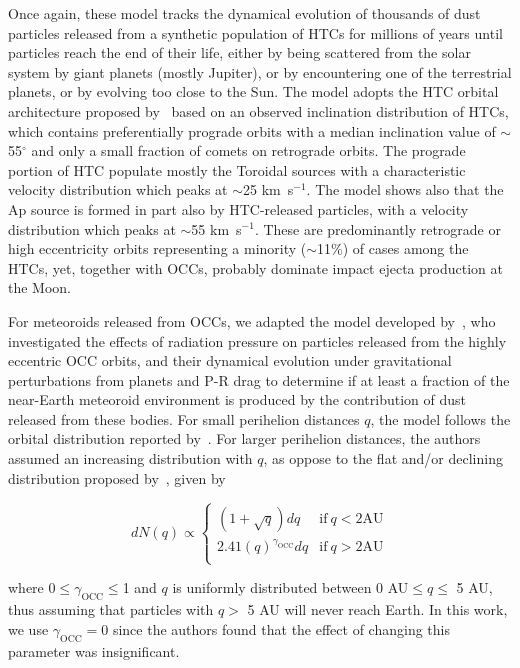\documentclass[twocolumn, trackchanges]{aastex62}
\begin{document}
Once again, these model tracks the dynamical evolution of thousands of dust particles released from a synthetic population of HTCs for millions of years until particles reach the end of their life, either by being scattered from the solar system by giant planets (mostly Jupiter), or by encountering one of the terrestrial planets, or by evolving too close to the Sun. The model adopts the HTC orbital architecture proposed by~\cite{Levison06} based on an observed inclination distribution of HTCs, which contains preferentially prograde orbits with a median inclination value of $\sim$55$^{\circ}$ and only a small fraction of comets on retrograde orbits. The prograde portion of HTC populate mostly the Toroidal sources with a characteristic velocity distribution which peaks at $\sim$25 km~s$^{-1}$. The model shows also that the Ap source is formed in part also by HTC-released particles, with a velocity distribution which peaks at $\sim$55 km~s$^{-1}$. These are predominantly retrograde or high eccentricity orbits representing a minority ($\sim$11\%) of cases among the HTCs, yet, together with OCCs, probably dominate impact ejecta production at the Moon.

For meteoroids released from OCCs, we adapted the model developed by~\cite{Nesvorny11b}, who investigated the effects of radiation pressure on particles released from the highly eccentric OCC orbits, and their dynamical evolution under gravitational perturbations from planets and P-R drag to determine if at least a fraction of the near-Earth meteoroid environment is produced by the contribution of dust released from these bodies. 
For small perihelion distances $q$, the model follows the orbital distribution reported by~\cite{Francis05}. For larger perihelion distances, the authors assumed an increasing distribution with $q$, as oppose to the flat and/or declining distribution proposed by~\cite{Francis05}, given by

\begin{equation}
dN(q)\propto
\begin{cases}
(1+\sqrt q)dq & \text{if}\ q<2 \mathrm{AU}\\
2.41(q)^{\gamma_\mathrm{OCC}} dq & \text{if}\ q> 2 \mathrm{AU}\\
\end{cases}
\end{equation}

\noindent where 0$\leq\gamma_\mathrm{OCC}\leq$1 and $q$ is uniformly distributed between 0 AU$\leq q\leq$ 5 AU, thus assuming that particles with $q>$ 5 AU will never reach Earth. In this work, we use $\gamma_\mathrm{OCC}= 0$ since the authors found that the effect of changing this parameter was insignificant.  
\end{document}
